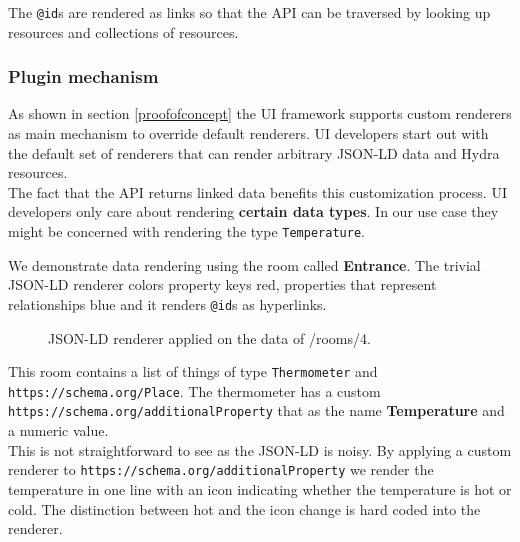 The \lstinline{@id}s are rendered as links so that the API can be traversed by looking up resources and collections of resources.

\subsubsection{Plugin mechanism}\label{pluginmechanism}
As shown in section \ref{proofofconcept} the UI framework supports custom renderers as main mechanism to override default renderers. UI developers start out with the default set of renderers that can render arbitrary JSON-LD data and Hydra resources. \\
The fact that the API returns linked data benefits this customization process. UI developers only care about rendering \textbf{certain data types}. In our use case they might be concerned with rendering the type \lstinline{Temperature}.

We demonstrate data rendering using the room called \textbf{Entrance}. The trivial JSON-LD renderer colors property keys red, properties that represent relationships blue and it renders \lstinline{@id}s as hyperlinks.

\begin{figure}[!htb]
  \caption{JSON-LD renderer applied on the data of /rooms/4.}
\end{figure}

This room contains a list of things of type \lstinline{Thermometer} and \lstinline{https://schema.org/Place}. The thermometer has a custom \lstinline{https://schema.org/additionalProperty} that as the name \textbf{Temperature} and a numeric value. \\
This is not straightforward to see as the JSON-LD is noisy. By applying a custom renderer to \lstinline{https://schema.org/additionalProperty} we render the temperature in one line with an icon indicating whether the temperature is hot or cold. The distinction between hot and the icon change is hard coded into the renderer.

